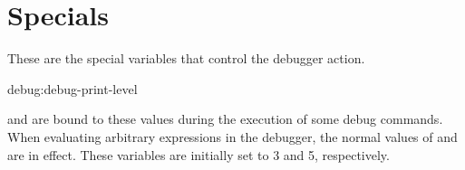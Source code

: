 \section{Specials}
These are the special variables that control the debugger action.

\begin{defvar}{debug:}{debug-print-level}
  
   and  are bound to these
  values during the execution of some debug commands.  When evaluating
  arbitrary expressions in the debugger, the normal values of
   and  are in effect.  These
  variables are initially set to 3 and 5, respectively.
\end{defvar}
